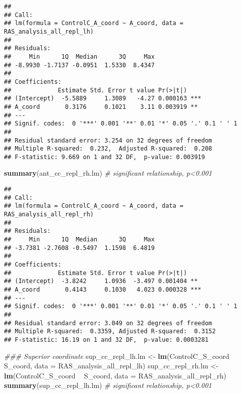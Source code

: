\documentclass[
]{article}
\newenvironment{Shaded}{\begin{snugshade}}{\end{snugshade}}
\newcommand{\CommentTok}[1]{\textcolor[rgb]{0.56,0.35,0.01}{\textit{#1}}}
\newcommand{\DataTypeTok}[1]{\textcolor[rgb]{0.13,0.29,0.53}{#1}}
\newcommand{\KeywordTok}[1]{\textcolor[rgb]{0.13,0.29,0.53}{\textbf{#1}}}
\newcommand{\NormalTok}[1]{#1}
\newcommand{\OperatorTok}[1]{\textcolor[rgb]{0.81,0.36,0.00}{\textbf{#1}}}
\newcommand{\StringTok}[1]{\textcolor[rgb]{0.31,0.60,0.02}{#1}}
\begin{document}
\begin{verbatim}
## 
## Call:
## lm(formula = ControlC_A_coord ~ A_coord, data = RAS_analysis_all_repl_lh)
## 
## Residuals:
##     Min      1Q  Median      3Q     Max 
## -8.9930 -1.7137 -0.0951  1.5330  8.4347 
## 
## Coefficients:
##             Estimate Std. Error t value Pr(>|t|)    
## (Intercept)  -5.5889     1.3089   -4.27 0.000163 ***
## A_coord       0.3176     0.1021    3.11 0.003919 ** 
## ---
## Signif. codes:  0 '***' 0.001 '**' 0.01 '*' 0.05 '.' 0.1 ' ' 1
## 
## Residual standard error: 3.254 on 32 degrees of freedom
## Multiple R-squared:  0.232,  Adjusted R-squared:  0.208 
## F-statistic: 9.669 on 1 and 32 DF,  p-value: 0.003919
\end{verbatim}

\begin{Shaded}
\begin{Highlighting}[]
\KeywordTok{summary}\NormalTok{(ant_cc_repl_rh.lm) }\CommentTok{# significant relationship, p<0.001}
\end{Highlighting}
\end{Shaded}

\begin{verbatim}
## 
## Call:
## lm(formula = ControlC_A_coord ~ A_coord, data = RAS_analysis_all_repl_rh)
## 
## Residuals:
##     Min      1Q  Median      3Q     Max 
## -3.7381 -2.7608 -0.5497  1.1598  6.4819 
## 
## Coefficients:
##             Estimate Std. Error t value Pr(>|t|)    
## (Intercept)  -3.8242     1.0936  -3.497 0.001404 ** 
## A_coord       0.4143     0.1030   4.023 0.000328 ***
## ---
## Signif. codes:  0 '***' 0.001 '**' 0.01 '*' 0.05 '.' 0.1 ' ' 1
## 
## Residual standard error: 3.049 on 32 degrees of freedom
## Multiple R-squared:  0.3359, Adjusted R-squared:  0.3152 
## F-statistic: 16.19 on 1 and 32 DF,  p-value: 0.0003281
\end{verbatim}

\begin{Shaded}
\begin{Highlighting}[]
\CommentTok{### Superior coordinate}
\NormalTok{sup_cc_repl_lh.lm <-}\StringTok{ }\KeywordTok{lm}\NormalTok{(ControlC_S_coord }\OperatorTok{~}\StringTok{ }\NormalTok{S_coord, }\DataTypeTok{data =}\NormalTok{ RAS_analysis_all_repl_lh)}
\NormalTok{sup_cc_repl_rh.lm <-}\StringTok{ }\KeywordTok{lm}\NormalTok{(ControlC_S_coord }\OperatorTok{~}\StringTok{ }\NormalTok{S_coord, }\DataTypeTok{data =}\NormalTok{ RAS_analysis_all_repl_rh)}
\KeywordTok{summary}\NormalTok{(sup_cc_repl_lh.lm) }\CommentTok{# significant relationship, p<0.001}
\end{Highlighting}
\end{Shaded}
\end{document}
